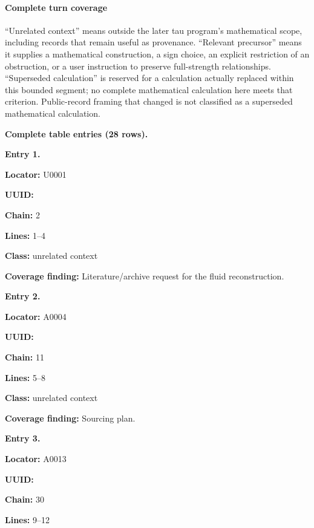\paragraph{Complete turn coverage}\label{complete-turn-coverage}

``Unrelated context'' means outside the later tau program's mathematical
scope, including records that remain useful as provenance. ``Relevant
precursor'' means it supplies a mathematical construction, a sign
choice, an explicit restriction of an obstruction, or a user instruction
to preserve full-strength relationships. ``Superseded calculation'' is
reserved for a calculation actually replaced within this bounded
segment; no complete mathematical calculation here meets that criterion.
Public-record framing that changed is not classified as a superseded
mathematical calculation.

\textbf{Complete table entries (28 rows).}


\textbf{Entry 1.}

\textbf{Locator:} U0001

\textbf{UUID:} \protect{}

\textbf{Chain:} 2

\textbf{Lines:} 1--4

\textbf{Class:} unrelated context

\textbf{Coverage finding:} Literature/archive request for the fluid
reconstruction.


\textbf{Entry 2.}

\textbf{Locator:} A0004

\textbf{UUID:} \protect{}

\textbf{Chain:} 11

\textbf{Lines:} 5--8

\textbf{Class:} unrelated context

\textbf{Coverage finding:} Sourcing plan.


\textbf{Entry 3.}

\textbf{Locator:} A0013

\textbf{UUID:} \protect{}

\textbf{Chain:} 30

\textbf{Lines:} 9--12

